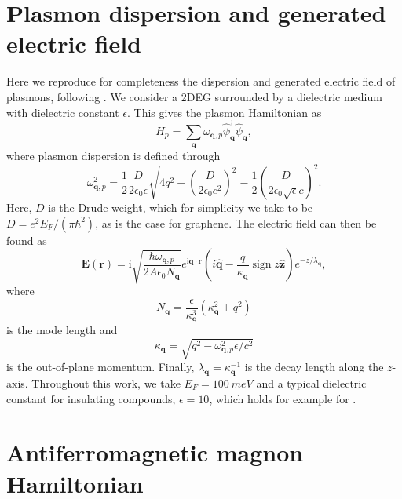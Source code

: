 \documentclass[aps,prb,reprint,twocolumns,superscriptaddress,nofootinbib]{revtex4-2}
\newcommand{\ii}{\mathrm{i}}
\DeclareMathOperator{\sign}{sign}
\newcommand{\epsilonplasmon}{\num{10}}
\newcommand{\Efermi}{\SI{100}{meV}}
\begin{document}
	
	\appendix
	
	\section{Plasmon dispersion and generated electric field}
	\label{app:plasmon}
	Here we reproduce for completeness the dispersion and generated electric field of plasmons, following \textcite{ferreiraQuantizationGraphenePlasmons2020}. We consider a 2DEG surrounded by a dielectric medium with dielectric constant $\epsilon$. This gives the plasmon Hamiltonian as
	\begin{equation}
		H_p = \sum_{\bm q} \omega_{\bm q,p} \hat \psi_{\bm{q}}^\dagger \hat\psi_{\bm q},
	\end{equation} where plasmon dispersion is defined through
	\begin{equation}
		\omega_{\bm q,p}^2 = \frac{1}{2}\frac{D}{2\epsilon_0 \epsilon}\sqrt{4q^2 + \left(\frac{D}{2\epsilon_0 c^2}\right)^2} - \frac{1}{2}\left(\frac{D}{2\epsilon_0 \sqrt{\epsilon}c}\right)^2.
	\end{equation}
	Here, $D$ is the Drude weight, which for simplicity we take to be $D = e^2 E_F / (\pi\hbar^2)$, as is the case for graphene. The electric field can then be found as
	\begin{equation}
		\bm E(\bm r) = \ii\sqrt{\frac{\hbar\omega_{\bm q,p} }{2A\epsilon_0 N_{\bm q}}} e^{\ii\bm q \cdot \bm r} \left(i \hat{\bm {q}} - \frac{q}{\kappa_{\bm q}}\sign{z}\hat{\bm z} \right) e^{- z/\lambda_{\bm q}},
	\end{equation}
	where 
	\begin{equation}
		N_{\bm q} = \frac{\epsilon}{\kappa^3_{\bm q}}\left(\kappa_{\bm q}^2 + q^2\right)
	\end{equation}
	is the mode length and
	\begin{equation}
		\kappa_{\bm q} = \sqrt{q^2 - \omega_{\bm q,p}^2\epsilon/c^2}
	\end{equation}
	is the out-of-plane momentum.  Finally, $\lambda_{\bm q}=\kappa_{\bm q}^{-1}$ is the decay length along the $z$-axis.
	Throughout this work, we take $E_F=\Efermi$ and a typical  dielectric constant for insulating compounds, $\epsilon=\epsilonplasmon$, which holds for example for   \cite{seehraEffectTemperatureAntiferromagnetic1986}.
	
	
	
	\section{Antiferromagnetic magnon Hamiltonian}
	
\end{document}
